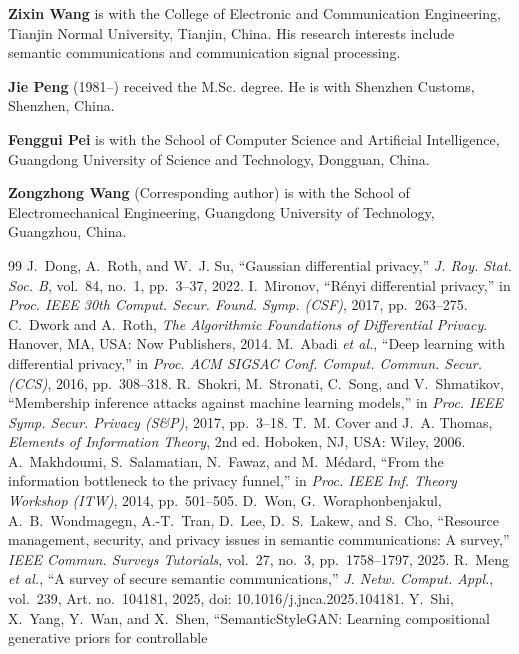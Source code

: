 \documentclass[10pt,twocolumn,letterpaper]{article}
\theoremstyle{plain}
\theoremstyle{definition}
\begin{document}
\textbf{Zixin Wang} is with the College of Electronic and Communication
Engineering, Tianjin Normal University, Tianjin, China. His research interests
include semantic communications and communication signal processing.

\textbf{Jie Peng} (1981--) received the M.Sc. degree. He is with Shenzhen
Customs, Shenzhen, China.

\textbf{Fenggui Pei} is with the School of Computer Science and Artificial
Intelligence, Guangdong University of Science and Technology, Dongguan, China.

\textbf{Zongzhong Wang} (Corresponding author) is with the School of
Electromechanical Engineering, Guangdong University of Technology, Guangzhou,
China.

\begin{thebibliography}{99}
 J.~Dong, A.~Roth, and W.~J. Su,
``Gaussian differential privacy,'' \emph{J. Roy. Stat. Soc. B}, vol.~84,
no.~1, pp.~3--37, 2022.
 I.~Mironov, ``R\'enyi differential privacy,'' in
\emph{Proc. IEEE 30th Comput. Secur. Found. Symp. (CSF)}, 2017, pp.~263--275.
 C.~Dwork and A.~Roth, \emph{The Algorithmic Foundations of
Differential Privacy}. Hanover, MA, USA: Now Publishers, 2014.
 M.~Abadi \emph{et al.}, ``Deep learning with differential
privacy,'' in \emph{Proc. ACM SIGSAC Conf. Comput. Commun. Secur. (CCS)}, 2016,
pp.~308--318.
 R.~Shokri, M.~Stronati, C.~Song, and V.~Shmatikov,
``Membership inference attacks against machine learning models,'' in
\emph{Proc. IEEE Symp. Secur. Privacy (S\&P)}, 2017, pp.~3--18.
 T.~M. Cover and J.~A. Thomas, \emph{Elements of Information
Theory}, 2nd ed. Hoboken, NJ, USA: Wiley, 2006.
 A.~Makhdoumi, S.~Salamatian, N.~Fawaz, and M.~M\'edard,
``From the information bottleneck to the privacy funnel,'' in \emph{Proc. IEEE
Inf. Theory Workshop (ITW)}, 2014, pp.~501--505.
 D.~Won, G.~Woraphonbenjakul, A.~B.~Wondmagegn,
A.-T.~Tran, D.~Lee, D.~S.~Lakew, and S.~Cho, ``Resource management, security,
and privacy issues in semantic communications: A survey,'' \emph{IEEE Commun.
Surveys Tutorials}, vol.~27, no.~3, pp.~1758--1797, 2025.
 R.~Meng \emph{et al.}, ``A survey of secure semantic
communications,'' \emph{J. Netw. Comput. Appl.}, vol.~239, Art. no.~104181,
2025, doi: 10.1016/j.jnca.2025.104181.
 Y.~Shi, X.~Yang, Y.~Wan, and X.~Shen,
``SemanticStyleGAN: Learning compositional generative priors for controllable

\end{thebibliography}
\end{document}
